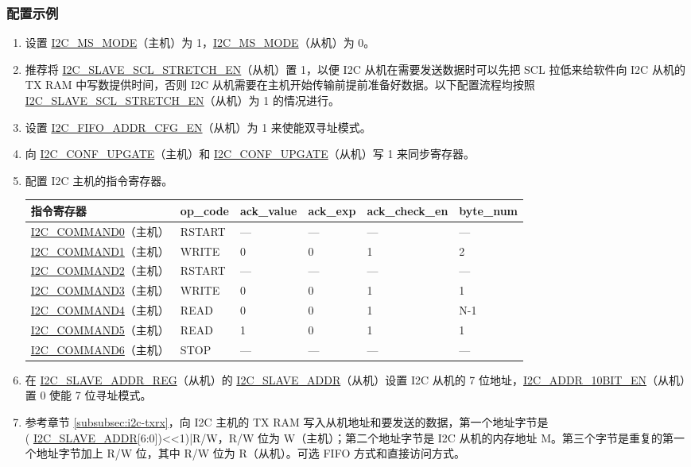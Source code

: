 \documentclass[main\_\_CN.tex]{subfiles}
\begin{document}
\subsubsection{配置示例}
\begin{enumerate}
\item 设置 \hyperref[fielddesc:I2CMSMODE]{I2C\_MS\_MODE}（主机）为 1，\hyperref[fielddesc:I2CMSMODE]{I2C\_MS\_MODE}（从机）为 0。
\item 推荐将 \hyperref[fielddesc:I2CSLAVESCLSTRETCHEN]{I2C\_SLAVE\_SCL\_STRETCH\_EN}（从机）置 1，以便 I2C 从机在需要发送数据时可以先把 SCL 拉低来给软件向 I2C 从机的 TX RAM 中写数提供时间，否则 I2C 从机需要在主机开始传输前提前准备好数据。以下配置流程均按照 \hyperref[fielddesc:I2CSLAVESCLSTRETCHEN]{I2C\_SLAVE\_SCL\_STRETCH\_EN}（从机）为 1 的情况进行。
\item 设置 \hyperref[fielddesc:I2CFIFOADDRCFGEN]{I2C\_FIFO\_ADDR\_CFG\_EN}（从机）为 1 来使能双寻址模式。
\item 向 \hyperref[fielddesc:I2CCONFUPGATE]{I2C\_CONF\_UPGATE}（主机）和 \hyperref[fielddesc:I2CCONFUPGATE]{I2C\_CONF\_UPGATE}（从机）写 1 来同步寄存器。
\item 配置 I2C 主机的指令寄存器。
\begin{longtable}{ | p{4cm} | p{2cm} | p{2cm} | p{2cm} |p{2cm} | p{2cm} |}
\hline\rowcolor{lightgray}
指令寄存器& op\_code & ack\_value&ack\_exp&ack\_check\_en&byte\_num  \\ \hline
\hyperref[fielddesc:I2CCOMMAND0]{I2C\_COMMAND0}（主机）& RSTART& ---&---&---&---  \\ \hline
\hyperref[fielddesc:I2CCOMMAND1]{I2C\_COMMAND1}（主机）& WRITE& 0&0&1&2  \\ \hline
\hyperref[fielddesc:I2CCOMMAND2]{I2C\_COMMAND2}（主机）& RSTART& ---&---&---&---  \\ \hline
\hyperref[fielddesc:I2CCOMMAND3]{I2C\_COMMAND3}（主机）& WRITE& 0&0&1&1  \\ \hline
\hyperref[fielddesc:I2CCOMMAND4]{I2C\_COMMAND4}（主机）& READ& 0&0&1&N-1  \\ \hline
\hyperref[fielddesc:I2CCOMMAND5]{I2C\_COMMAND5}（主机）& READ& 1&0&1&1  \\ \hline
\hyperref[fielddesc:I2CCOMMAND6]{I2C\_COMMAND6}（主机）& STOP& ---&---&---&---  \\ \hline
\end{longtable}

\item 在 \hyperref[regdesc:I2CSLAVEADDRREG]{I2C\_SLAVE\_ADDR\_REG}（从机）的 \hyperref[fielddesc:I2CSLAVEADDR]{I2C\_SLAVE\_ADDR}（从机）设置 I2C 从机的 7 位地址，\hyperref[fielddesc:I2CADDR10BITEN]{I2C\_ADDR\_10BIT\_EN}（从机）置 0 使能 7 位寻址模式。
\item 参考章节 \ref{subsubsec:i2c-txrx}，向 I2C 主机的 TX RAM 写入从机地址和要发送的数据，第一个地址字节是 \\( \hyperref[fielddesc:I2CSLAVEADDR]{I2C\_SLAVE\_ADDR}[6:0])<<1)|R/W，R/W 位为 W（主机）；第二个地址字节是 I2C 从机的内存地址 M。第三个字节是重复的第一个地址字节加上 R/W 位，其中 R/W 位为 R（从机）。可选 FIFO 方式和直接访问方式。


\end{enumerate}
\end{document}
